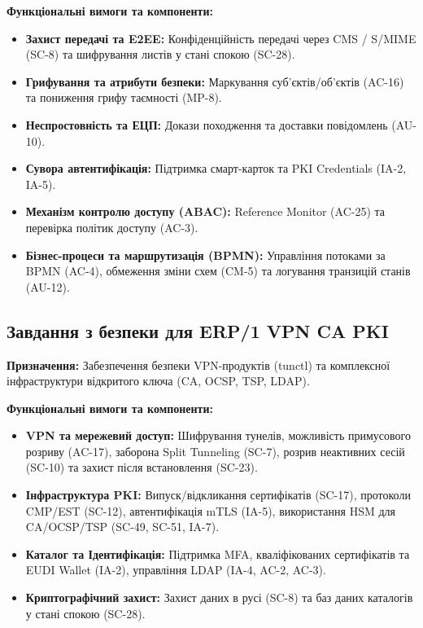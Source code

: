 \documentclass{article}
\begin{document}
\textbf{Функціональні вимоги та компоненти:}
\begin{itemize}
    \item \textbf{Захист передачі та E2EE:} Конфіденційність передачі через CMS / S/MIME (SC-8) та шифрування листів у стані спокою (SC-28).
    \item \textbf{Грифування та атрибути безпеки:} Маркування суб'єктів/об'єктів (AC-16) та пониження грифу таємності (MP-8).
    \item \textbf{Неспростовність та ЕЦП:} Докази походження та доставки повідомлень (AU-10).
    \item \textbf{Сувора автентифікація:} Підтримка смарт-карток та PKI Credentials (IA-2, IA-5).
    \item \textbf{Механізм контролю доступу (ABAC):} Reference Monitor (AC-25) та перевірка політик доступу (AC-3).
    \item \textbf{Бізнес-процеси та маршрутизація (BPMN):} Управління потоками за BPMN (AC-4), обмеження зміни схем (CM-5) та логування транзицій станів (AU-12).
\end{itemize}

\subsection{Завдання з безпеки для ERP/1 VPN CA PKI}

\textbf{Призначення:} Забезпечення безпеки VPN-продуктів (tunctl) та комплексної інфраструктури відкритого ключа (CA, OCSP, TSP, LDAP).

\textbf{Функціональні вимоги та компоненти:}
\begin{itemize}
    \item \textbf{VPN та мережевий доступ:} Шифрування тунелів, можливість примусового розриву (AC-17), заборона Split Tunneling (SC-7), розрив неактивних сесій (SC-10) та захист після встановлення (SC-23).
    \item \textbf{Інфраструктура PKI:} Випуск/відкликання сертифікатів (SC-17), протоколи CMP/EST (SC-12), автентифікація mTLS (IA-5), використання HSM для CA/OCSP/TSP (SC-49, SC-51, IA-7).
    \item \textbf{Каталог та Ідентифікація:} Підтримка MFA, кваліфікованих сертифікатів та EUDI Wallet (IA-2), управління LDAP (IA-4, AC-2, AC-3).
    \item \textbf{Криптографічний захист:} Захист даних в русі (SC-8) та баз даних каталогів у стані спокою (SC-28).
\end{itemize}
\end{document}
